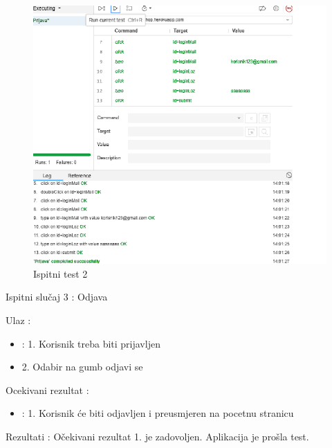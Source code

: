 			\begin{figure}[H]
				\includegraphics[width=1\linewidth]{slike/ispitni_test_2.png} %
				\caption{Ispitni test 2}
				\label{fig:Test2} %
			\end{figure}			

			\noindent Ispitni slučaj 3 : Odjava

			\noindent Ulaz : 
	
			\begin{itemize}
				\item : 1. Korisnik treba biti prijavljen
				\item   2. Odabir na gumb odjavi se
			\end{itemize}

			\noindent Ocekivani rezultat : 

			\begin{itemize}
				\item : 1. Korisnik će biti odjavljen i preusmjeren na pocetnu stranicu
			\end{itemize}
	
			\noindent Rezultati : Očekivani rezultat 1. je zadovoljen. Aplikacija je prošla test. 

